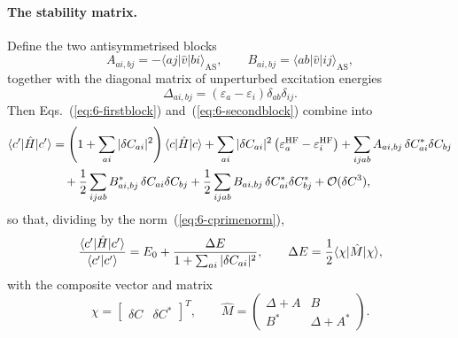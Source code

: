 \paragraph{The stability matrix.}
Define the two antisymmetrised blocks
\begin{equation}
  A_{ai,bj} = -\langle aj\vert\hat{v}\vert bi\rangle_{\mathrm{AS}},
  \qquad
  B_{ai,bj} = \langle ab\vert\hat{v}\vert ij\rangle_{\mathrm{AS}},
  \label{eq:6-ABblocks}
\end{equation}
together with the diagonal matrix of unperturbed excitation energies
\begin{equation}
  \Delta_{ai,bj}
    = \left(\varepsilon_a-\varepsilon_i\right)
      \delta_{ab}\delta_{ij}.
  \label{eq:6-Delta}
\end{equation}
Then Eqs.~(\ref{eq:6-firstblock}) and~(\ref{eq:6-secondblock}) combine into
\begin{align}
  \langle c' | \hat{H} | c' \rangle
  &= \left(1+\sum_{ai}\vert\delta C_{ai}\vert^2\right)
     \langle c | \hat{H} | c \rangle
   + \sum_{ai}\vert\delta C_{ai}\vert^2
     \left(\varepsilon^{\mathrm{HF}}_a-\varepsilon^{\mathrm{HF}}_i\right)
   + \sum_{ijab}A_{ai,bj}\,\delta C^{*}_{ai}\delta C_{bj}
   \nonumber\\
  &\quad
   + \frac{1}{2}\sum_{ijab}B^{*}_{ai,bj}\,\delta C_{ai}\delta C_{bj}
   + \frac{1}{2}\sum_{ijab}B_{ai,bj}\,
       \delta C^{*}_{ai}\delta C^{*}_{bj}
   + \mathcal{O}(\delta C^3),
  \label{eq:6-energyquadratic}
\end{align}
so that, dividing by the norm~(\ref{eq:6-cprimenorm}),
\begin{equation}
  \frac{\langle c' | \hat{H} | c' \rangle}{\langle c' \vert c' \rangle}
  = E_0 + \frac{\Delta E}
    {1+\sum_{ai}\vert\delta C_{ai}\vert^2},
  \qquad
  \Delta E = \frac{1}{2}\langle \chi | \hat{M} | \chi \rangle,
  \label{eq:6-deltaE}
\end{equation}
with the composite vector and matrix
\begin{equation}
  \chi = \begin{bmatrix}\delta C & \delta C^{*}\end{bmatrix}^{T},
  \qquad
  \hat{M} = \begin{pmatrix}
    \Delta + A & B\\
    B^{*} & \Delta + A^{*}
  \end{pmatrix}.
  \label{eq:6-stabilitymatrix}
\end{equation}

